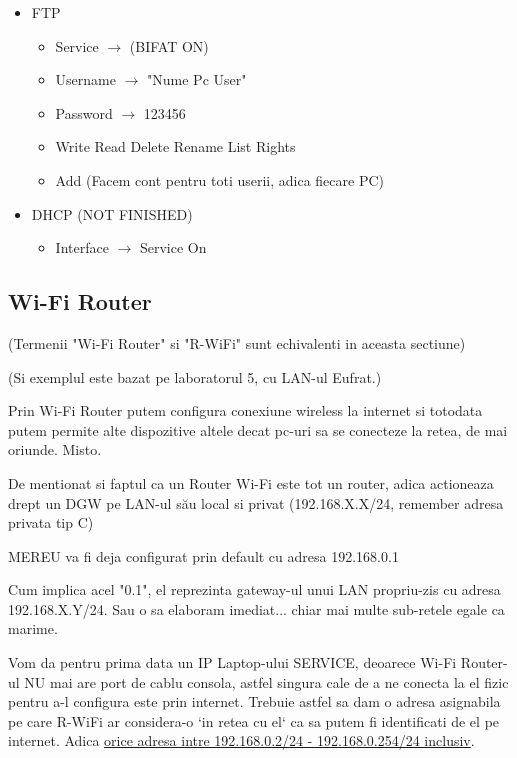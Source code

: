\documentclass{article}
\begin{document}
\begin{itemize}
\begin{itemize}
        \end{itemize}
    \item FTP
        \begin{itemize}
            \item Service $\rightarrow$ (BIFAT ON)
            \item Username $\rightarrow$ "Nume Pc User"
            \item Password $\rightarrow$ 123456
            \item Write Read Delete Rename List Rights
            \item Add (Facem cont pentru toti userii, adica fiecare PC)
        \end{itemize}
    \item DHCP (NOT FINISHED)
        \begin{itemize}
            \item Interface $\rightarrow$ Service On
        \end{itemize}
\end{itemize}




\newpage

\subsection{Wi-Fi Router}
(Termenii "Wi-Fi Router" si "R-WiFi" sunt echivalenti in aceasta sectiune)

(Si exemplul este bazat pe laboratorul 5, cu LAN-ul Eufrat.)

Prin Wi-Fi Router putem configura conexiune wireless la internet si totodata putem permite alte dispozitive altele decat pc-uri sa se conecteze la retea, de mai oriunde. Misto.

De mentionat si faptul ca un Router Wi-Fi este tot un router, adica actioneaza drept un DGW pe LAN-ul său local si privat (192.168.X.X/24, remember adresa privata tip C)

MEREU va fi deja configurat prin default cu adresa 192.168.0.1

Cum implica acel "0.1", el reprezinta gateway-ul unui LAN propriu-zis cu adresa 192.168.X.Y/24. Sau o sa elaboram imediat... chiar mai multe sub-retele egale ca marime. 

Vom da pentru prima data un IP Laptop-ului SERVICE, deoarece Wi-Fi Router-ul NU mai are port de cablu consola, astfel singura cale de a ne conecta la el fizic pentru a-l configura este prin internet. Trebuie astfel sa dam o adresa asignabila pe care R-WiFi ar considera-o `in retea cu el` ca sa putem fi identificati de el pe internet. Adica \underline{orice adresa intre 192.168.0.2/24 - 192.168.0.254/24 inclusiv}.
\end{document}
